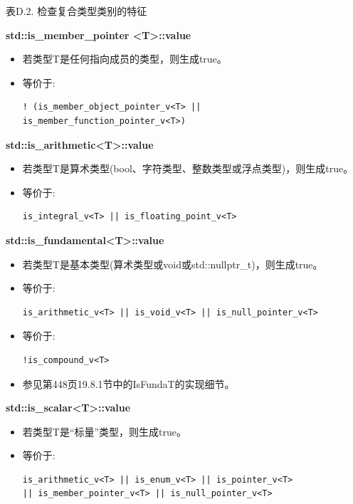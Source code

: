 \begin{center}
表D.2. 检查复合类型类别的特征
\end{center}

\textbf{std::is\_member\_pointer <T>::value}

\begin{itemize}
\item 
若类型T是任何指向成员的类型，则生成true。

\item 
等价于: 
\begin{lstlisting}[style=styleCXX]
! (is_member_object_pointer_v<T> || is_member_function_pointer_v<T>)
\end{lstlisting}
\end{itemize}

\textbf{std::is\_arithmetic<T>::value}

\begin{itemize}
\item 
若类型T是算术类型(bool、字符类型、整数类型或浮点类型)，则生成true。

\item 
等价于: 
\begin{lstlisting}[style=styleCXX]
is_integral_v<T> || is_floating_point_v<T>
\end{lstlisting}
\end{itemize}

\textbf{std::is\_fundamental<T>::value}

\begin{itemize}
\item 
若类型T是基本类型(算术类型或void或std::nullptr\_t)，则生成true。

\item 
等价于: 
\begin{lstlisting}[style=styleCXX]
is_arithmetic_v<T> || is_void_v<T> || is_null_pointer_v<T>
\end{lstlisting}

\item 
等价于: 
\begin{lstlisting}[style=styleCXX]
!is_compound_v<T>
\end{lstlisting}

\item 
参见第448页19.8.1节中的IsFundaT的实现细节。
\end{itemize}

\textbf{std::is\_scalar<T>::value}

\begin{itemize}
\item 
若类型T是“标量”类型，则生成true。

\item 
等价于:  
\begin{lstlisting}[style=styleCXX]
is_arithmetic_v<T> || is_enum_v<T> || is_pointer_v<T>
|| is_member_pointer_v<T> || is_null_pointer_v<T>
\end{lstlisting}
\end{itemize}

